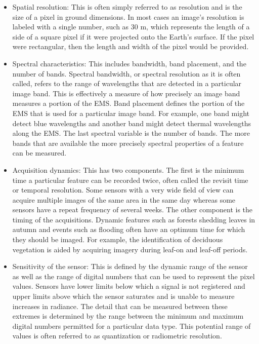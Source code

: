     \begin{itemize}
        \item Spatial resolution: This is often simply referred to as resolution and is the size of a pixel in ground dimensions. 
        In most cases an image's resolution is labeled with a single number, such as 30 m, which represents the length of a side of a square pixel if it were projected onto the Earth's surface.
        If the pixel were rectangular, then the length and width of the pixel would be provided.
        \item Spectral characteristics: This includes bandwidth, band placement, and the number of bands.
        Spectral bandwidth, or spectral resolution as it is often called, refers to the range of wavelengths that are detected in a particular image band.
        This is effectively a measure of how precisely an image band measures a portion of the EMS.
        Band placement defines the portion of the EMS that is used for a particular image band.
        For example, one band might detect blue wavelengths and another band might detect thermal wavelengths along the EMS.
        The last spectral variable is the number of bands. The more bands that are available the more precisely spectral properties of a feature can be measured.
        \item Acquisition dynamics: This has two components. The first is the minimum time a particular feature can be recorded twice, often called the revisit time or temporal resolution.
        Some sensors with a very wide field of view can acquire multiple images of the same area in the same day whereas some sensors have a repeat frequency of several weeks.
        The other component is the timing of the acquisitions. 
        Dynamic features such as forests shedding leaves in autumn and events such as flooding often have an optimum time for which they should be imaged.
        For example, the identification of deciduous vegetation is aided by acquiring imagery during leaf-on and leaf-off periods.
        \item Sensitivity of the sensor: This is defined by the dynamic range of the sensor as well as the range of digital numbers that can be used to represent the pixel values.
        Sensors have lower limits below which a signal is not registered and upper limits above which the sensor saturates and is unable to measure increases in radiance.
        The detail that can be measured between these extremes is determined by the range between the minimum and maximum digital numbers permitted for a particular data type.
        This potential range of values is often referred to as quantization or radiometric resolution.
    \end{itemize}
    
